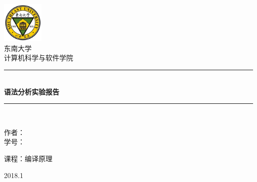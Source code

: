 \begin{titlepage}
\begin{center}

\includegraphics[width=0.15\textwidth]{../assets/logo.jpg}\\[1cm]

\textsc{\LARGE 东南大学} \\[1.5cm]
\textsc{\Large 计算机科学与软件学院} \\[0.5cm]

{\rule{\linewidth}{1mm}}\\[0.4cm]
{\huge \bfseries 语法分析实验报告} \\[0.4cm]
{\rule{\linewidth}{0.5mm}}\\[1.5cm]

\begin{minipage}{0.4\textwidth}
\begin{flushleft}
\large
作者：\\
学号：
\end{flushleft}
\end{minipage}
\begin{minipage}{0.4\textwidth}
\end{minipage}
\begin{minipage}{0.4\textwidth}
\begin{flushright}
\large
课程：编译原理
\end{flushright}
\end{minipage}

\vfill

{\large 2018.1}

\end{center}
\end{titlepage}
